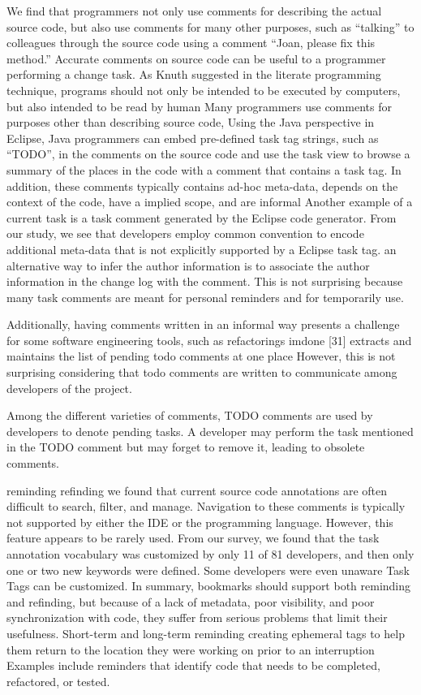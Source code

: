 \cite{ying_source_2005}
We find that programmers not only use comments for describing the actual source code, but also use comments for many other purposes, such as “talking” to colleagues through the source code using a comment “Joan, please fix this method.”
Accurate comments on source code can be useful to a programmer performing a change task. As Knuth suggested in the literate programming technique, programs should not only be intended to be executed by computers, but also intended to be read by human
Many programmers use comments for purposes other than describing source code,
Using the Java perspective in Eclipse, Java programmers can embed pre-defined task tag strings, such as “TODO”, in the comments on the source code and use the task view to browse a summary of the places in the code with a comment that contains a task tag.
In addition, these comments typically contains ad-hoc meta-data, depends on the context of the code, have a implied scope, and are informal
Another example of a current task is a task comment generated by the Eclipse code generator.
From our study, we see that developers employ common convention to encode additional meta-data that is not explicitly supported by a Eclipse task tag.
an alternative way to infer the author information is to associate the author information in the change log with the comment.
This is not surprising because many task comments are meant for personal reminders and for temporarily use.

\cite{nie_framework_2019}
Additionally, having comments written in an informal way presents a challenge for some software engineering tools, such as refactorings
imdone [31] extracts and maintains the list of pending todo comments at one place
However, this is not surprising considering that todo comments are written to communicate among developers of the project.

\cite{sridhara_automatically_2016}
Among the different varieties of comments, TODO comments are used by developers to denote pending tasks.
A developer may perform the task mentioned in the TODO comment but may forget to remove it, leading to obsolete comments.

\cite{storey_todo_2008}

\cite{storey_how_2009}
reminding
refinding
we found that current source code annotations are often difficult to search, filter, and manage.
Navigation to these comments is typically not supported by either the IDE or the programming language.
However, this feature appears to be rarely used. From our survey, we found that the task annotation vocabulary was customized by only 11 of 81 developers, and then only one or two new keywords were defined. Some developers were even unaware Task Tags can be customized.
In summary, bookmarks should support both reminding and refinding, but because of a lack of metadata, poor visibility, and poor synchronization with code, they suffer from serious problems that limit their usefulness.
Short-term and long-term reminding
creating ephemeral tags to help them return to the location they were working on prior to an interruption
Examples include reminders that identify code that needs to be completed, refactored, or tested.


